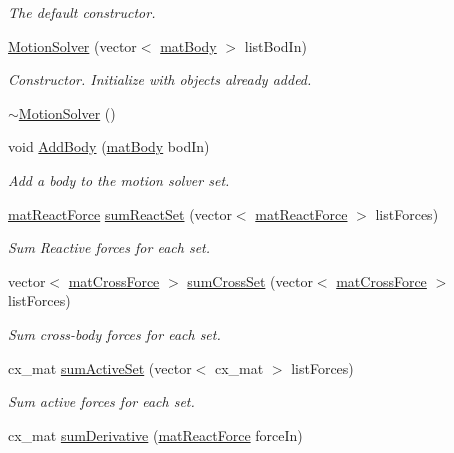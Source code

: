 \begin{DoxyCompactItemize}
\begin{DoxyCompactList}\small\item\em The default constructor. \end{DoxyCompactList}\item 
\hyperlink{class_motion_solver_af5ddc959738154c51b9c877b87670a5b}{Motion\-Solver} (vector$<$ \hyperlink{classmat_body}{mat\-Body} $>$ list\-Bod\-In)
\begin{DoxyCompactList}\small\item\em Constructor. Initialize with objects already added. \end{DoxyCompactList}\item 
\hyperlink{class_motion_solver_ae1fb5f389752a21a6d65ce41599b9b91}{$\sim$\-Motion\-Solver} ()
\item 
void \hyperlink{class_motion_solver_a656b01e691319a9113eaccf1f8e55570}{Add\-Body} (\hyperlink{classmat_body}{mat\-Body} bod\-In)
\begin{DoxyCompactList}\small\item\em Add a body to the motion solver set. \end{DoxyCompactList}\item 
\hyperlink{classmat_react_force}{mat\-React\-Force} \hyperlink{class_motion_solver_ae236a6bf04932d75d4e98052ef10d918}{sum\-React\-Set} (vector$<$ \hyperlink{classmat_react_force}{mat\-React\-Force} $>$ list\-Forces)
\begin{DoxyCompactList}\small\item\em Sum Reactive forces for each set. \end{DoxyCompactList}\item 
vector$<$ \hyperlink{classmat_cross_force}{mat\-Cross\-Force} $>$ \hyperlink{class_motion_solver_a7386a0a14180cb7bee3612dae4ca6454}{sum\-Cross\-Set} (vector$<$ \hyperlink{classmat_cross_force}{mat\-Cross\-Force} $>$ list\-Forces)
\begin{DoxyCompactList}\small\item\em Sum cross-\/body forces for each set. \end{DoxyCompactList}\item 
cx\-\_\-mat \hyperlink{class_motion_solver_a933c30bb482dcc91c629bc5505b54139}{sum\-Active\-Set} (vector$<$ cx\-\_\-mat $>$ list\-Forces)
\begin{DoxyCompactList}\small\item\em Sum active forces for each set. \end{DoxyCompactList}\item 
cx\-\_\-mat \hyperlink{class_motion_solver_a0329ea30a70df3544d58c52100f332d2}{sum\-Derivative} (\hyperlink{classmat_react_force}{mat\-React\-Force} force\-In)

\end{DoxyCompactItemize}
